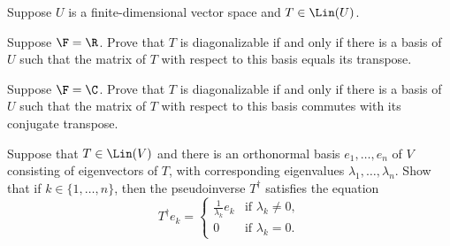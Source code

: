 \begin{exercise}
Suppose $U$ is a finite-dimensional vector space and $T\in\Lin(U)$.
\begin{parts}
\item Suppose $\F=\R$. Prove that $T$ is diagonalizable if and only if there is
  a basis of $U$ such that the matrix of $T$ with respect to this basis equals
  its transpose.
\item Suppose $\F=\C$. Prove that $T$ is diagonalizable if and only if there is
  a basis of $U$ such that the matrix of $T$ with respect to this basis
  commutes with its conjugate transpose.
\end{parts}
\end{exercise}

\begin{exercise}
Suppose that $T\in\Lin(V)$ and there is an orthonormal basis $e_1,\dots,e_n$ of
$V$ consisting of eigenvectors of $T$, with corresponding eigenvalues
$\lambda_1,\dots,\lambda_n$. Show that if $k\in\{1,\dots,n\}$, then the
pseudoinverse $T^\dagger$ satisfies the equation
\[ T^\dagger e_k = \begin{cases} \frac{1}{\lambda_k}e_k & \text{if }
   \lambda_k\ne0,\\ 0 & \text{if } \lambda_k=0. \end{cases} \]
\end{exercise}
